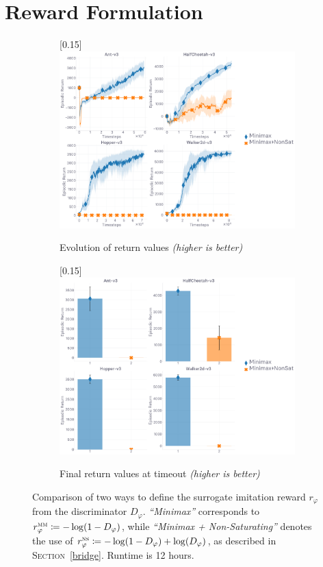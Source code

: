 \section{Reward Formulation}
\label{ablationreward}

\begin{figure}[H]
  \center
  \begin{subfigure}[t]{0.49\textwidth}
    \center\scalebox{0.15}[0.15]{\includegraphics{Plots/fig18_minimax_4envs/plots_eval_env_ret_plot.pdf}}
    \caption{Evolution of return values \textit{(higher is better)}}
  \end{subfigure}
  \begin{subfigure}[t]{0.49\textwidth}
    \center\scalebox{0.15}[0.15]{\includegraphics{Plots/fig18_minimax_4envs/plots_eval_env_ret_barplot.pdf}}
    \caption{Final return values at timeout \textit{(higher is better)}}
  \end{subfigure}
  \caption{
  Comparison of two ways to define the surrogate imitation reward $r_\varphi$
  from the discriminator $D_\varphi$.
  \textit{``Minimax''} corresponds to
  $r_\varphi^\textsc{mm} \coloneqq -\log(1-D_\varphi)$,
  while \textit{``Minimax + Non-Saturating''} denotes the use of
  $r_\varphi^\textsc{ns} \coloneqq -\log(1-D_\varphi) + \log(D_\varphi)$,
  as described in \textsc{Section}~\ref{bridge}.
  Runtime is 12 hours.}
\end{figure}

